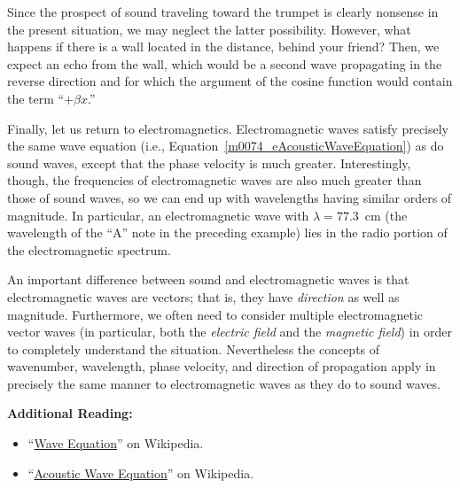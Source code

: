 Since the prospect of sound traveling toward the trumpet is clearly nonsense in the present situation, we may neglect the latter possibility.
However, what happens if there is a wall located in the distance, behind your friend?
Then, we expect an echo from the wall, which would be a second wave propagating in the reverse direction and for which the argument of the cosine function would contain the term ``$+\beta x$.''

Finally, let us return to electromagnetics.  
Electromagnetic waves satisfy precisely the same wave equation (i.e., Equation~\ref{m0074_eAcousticWaveEquation}) as do sound waves, except that the phase velocity is much greater.
Interestingly, though, the frequencies of electromagnetic waves are also much greater than those of sound waves, so we can end up with wavelengths having similar orders of magnitude.
In particular, an electromagnetic wave with $\lambda=77.3$~cm (the wavelength of the ``A'' note in the preceding example) lies in the radio portion of the electromagnetic spectrum.

An important difference between sound and electromagnetic waves is that electromagnetic waves are vectors; that is, they have \emph{direction} as well as magnitude.
Furthermore, we often need to consider multiple electromagnetic vector waves (in particular, both the \emph{electric field} and the \emph{magnetic field}) in order to completely understand the situation.
Nevertheless the concepts of wavenumber, wavelength, phase velocity, and direction of propagation apply in precisely the same manner to electromagnetic waves as they do to sound waves.  

{\bf Additional Reading:}
\begin{itemize}
\item ``\href{https://en.wikipedia.org/wiki/Wave_equation}{Wave Equation}'' on Wikipedia.
\item ``\href{https://en.wikipedia.org/wiki/Acoustic_wave_equation}{Acoustic Wave Equation}'' on Wikipedia.
\end{itemize}













